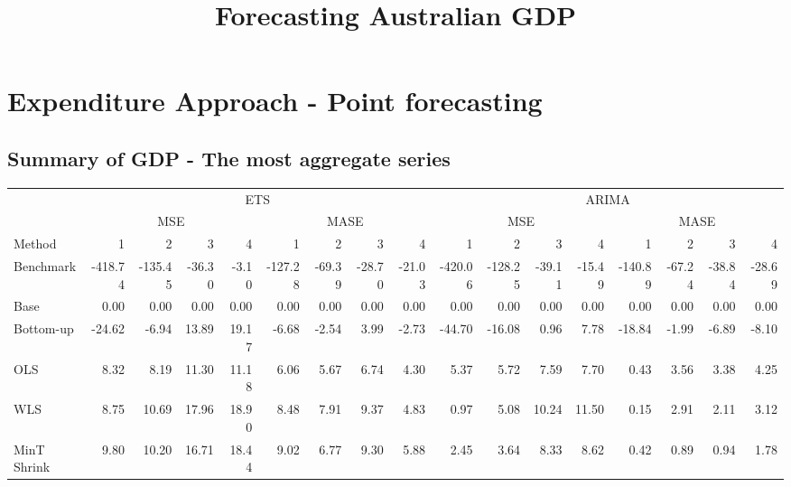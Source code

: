 \documentclass[]{article}
\title{Forecasting Australian GDP}
\author{}
\date{}
\begin{document}
\maketitle

\section{Expenditure Approach - Point
forecasting}\label{expenditure-approach---point-forecasting}

\subsection{Summary of GDP - The most aggregate
series}\label{summary-of-gdp---the-most-aggregate-series}

\begin{table}[H]
\centering
\begin{tabular}{l|r|r|r|r|r|r|r|r|r|r|r|r|r|r|r|r}
\hline
\multicolumn{1}{c|}{ } & \multicolumn{8}{|c|}{ETS} & \multicolumn{8}{|c}{ARIMA} \\
\cline{2-9} \cline{10-17}
\multicolumn{1}{c|}{ } & \multicolumn{4}{|c|}{MSE} & \multicolumn{4}{|c|}{MASE} & \multicolumn{4}{|c|}{MSE} & \multicolumn{4}{|c}{MASE} \\
\cline{2-5} \cline{6-9} \cline{10-13} \cline{14-17}
Method & 1 & 2 & 3 & 4 & 1 & 2 & 3 & 4 & 1 & 2 & 3 & 4 & 1 & 2 & 3 & 4\\
\hline
Benchmark & -418.74 & -135.45 & -36.30 & -3.10 & -127.28 & -69.39 & -28.70 & -21.03 & -420.06 & -128.25 & -39.11 & -15.49 & -140.89 & -67.24 & -38.84 & -28.69\\
\hline
Base & 0.00 & 0.00 & 0.00 & 0.00 & 0.00 & 0.00 & 0.00 & 0.00 & 0.00 & 0.00 & 0.00 & 0.00 & 0.00 & 0.00 & 0.00 & 0.00\\
\hline
Bottom-up & -24.62 & -6.94 & 13.89 & 19.17 & -6.68 & -2.54 & 3.99 & -2.73 & -44.70 & -16.08 & 0.96 & 7.78 & -18.84 & -1.99 & -6.89 & -8.10\\
\hline
OLS & 8.32 & 8.19 & 11.30 & 11.18 & 6.06 & 5.67 & 6.74 & 4.30 & 5.37 & 5.72 & 7.59 & 7.70 & 0.43 & 3.56 & 3.38 & 4.25\\
\hline
WLS & 8.75 & 10.69 & 17.96 & 18.90 & 8.48 & 7.91 & 9.37 & 4.83 & 0.97 & 5.08 & 10.24 & 11.50 & 0.15 & 2.91 & 2.11 & 3.12\\
\hline
MinT Shrink & 9.80 & 10.20 & 16.71 & 18.44 & 9.02 & 6.77 & 9.30 & 5.88 & 2.45 & 3.64 & 8.33 & 8.62 & 0.42 & 0.89 & 0.94 & 1.78\\
\hline
\end{tabular}
\end{table}
\end{document}
